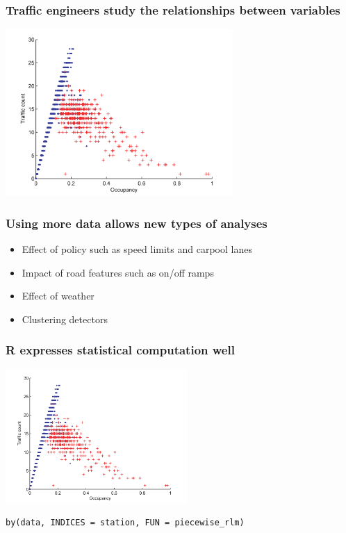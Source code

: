 \documentclass{beamer}
\begin{document}
\begin{frame}

    \frametitle{Traffic engineers study the relationships between variables
    \cite{li2011fundamental}}

\centerline{\includegraphics[height=2.5in]{fundamental_diagram.png}}

\end{frame}
\begin{frame}

    \frametitle{Using more data allows new types of analyses}

    \begin{itemize}
        \item Effect of policy such as speed limits and carpool lanes
        \item Impact of road features such as on/off ramps
        \item Effect of weather
        \item Clustering detectors
    \end{itemize}


\end{frame}
\begin{frame}[fragile]

    \frametitle{R expresses statistical computation well}

\centerline{\includegraphics[height=2in]{fundamental_diagram.png}}

\begin{verbatim}
by(data, INDICES = station, FUN = piecewise_rlm)
\end{verbatim}


\end{frame}
\end{document}
